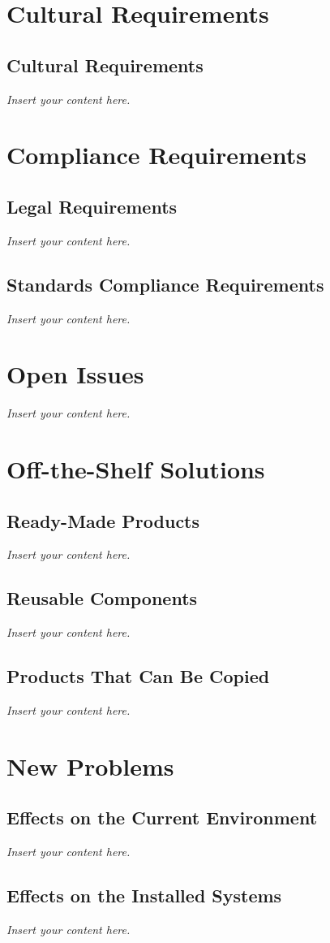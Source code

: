 \documentclass[12pt]{article}
\newcommand{\lips}{\textit{Insert your content here.}}
\begin{document}
\section{Cultural Requirements}
\subsection{Cultural Requirements}
\lips

\section{Compliance Requirements}
\subsection{Legal Requirements}
\lips
\subsection{Standards Compliance Requirements}
\lips

\section{Open Issues}
\lips

\section{Off-the-Shelf Solutions}
\subsection{Ready-Made Products}
\lips
\subsection{Reusable Components}
\lips
\subsection{Products That Can Be Copied}
\lips

\section{New Problems}
\subsection{Effects on the Current Environment}
\lips
\subsection{Effects on the Installed Systems}
\lips
\end{document}
